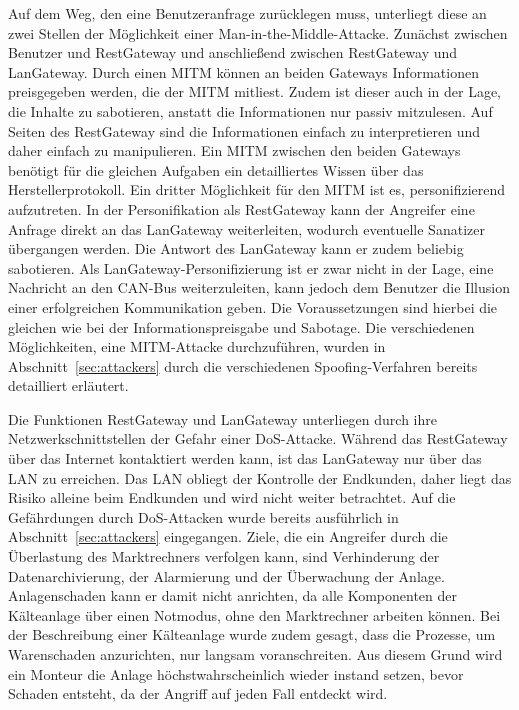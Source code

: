 \documentclass[11pt,a4paper]{report}
\begin{document}
Auf dem Weg, den eine Benutzeranfrage zurücklegen muss, unterliegt diese an zwei Stellen der Möglichkeit einer Man-in-the-Middle-Attacke. Zunächst zwischen Benutzer und RestGateway und anschließend zwischen RestGateway und LanGateway. Durch einen MITM können an beiden Gateways Informationen preisgegeben werden, die der MITM mitliest. Zudem ist dieser auch in der Lage, die Inhalte zu sabotieren, anstatt die Informationen nur passiv mitzulesen. Auf Seiten des RestGateway sind die Informationen einfach zu interpretieren und daher einfach zu manipulieren. Ein MITM zwischen den beiden Gateways benötigt für die gleichen Aufgaben ein detailliertes Wissen über das Herstellerprotokoll. Ein dritter Möglichkeit für den MITM ist es, personifizierend aufzutreten. In der Personifikation als RestGateway kann der Angreifer eine Anfrage direkt an das LanGateway weiterleiten, wodurch eventuelle Sanatizer übergangen werden. Die Antwort des LanGateway kann er zudem beliebig sabotieren. Als LanGateway-Personifizierung ist er zwar nicht in der Lage, eine Nachricht an den CAN-Bus weiterzuleiten, kann jedoch dem Benutzer die Illusion einer erfolgreichen Kommunikation geben. Die Voraussetzungen sind hierbei die gleichen wie bei der Informationspreisgabe und Sabotage. Die verschiedenen Möglichkeiten, eine MITM-Attacke durchzuführen, wurden in Abschnitt~\ref{sec:attackers} durch die verschiedenen Spoofing-Verfahren bereits detailliert erläutert.

Die Funktionen RestGateway und LanGateway unterliegen durch ihre Netzwerkschnittstellen der Gefahr einer DoS-Attacke. Während das RestGateway über das Internet kontaktiert werden kann, ist das LanGateway nur über das LAN zu erreichen. Das LAN obliegt der Kontrolle der Endkunden, daher liegt das Risiko alleine beim Endkunden und wird nicht weiter betrachtet. Auf die Gefährdungen durch DoS-Attacken wurde bereits ausführlich in Abschnitt~\ref{sec:attackers} eingegangen. Ziele, die ein Angreifer durch die Überlastung des Marktrechners verfolgen kann, sind Verhinderung der Datenarchivierung, der Alarmierung und der Überwachung der Anlage. Anlagenschaden kann er damit nicht anrichten, da alle Komponenten der Kälteanlage über einen Notmodus, ohne den Marktrechner arbeiten können. Bei der Beschreibung einer Kälteanlage wurde zudem gesagt, dass die Prozesse, um Warenschaden anzurichten, nur langsam voranschreiten. Aus diesem Grund wird ein Monteur die Anlage höchstwahrscheinlich wieder instand setzen, bevor Schaden entsteht, da der Angriff auf jeden Fall entdeckt wird.
\end{document}
